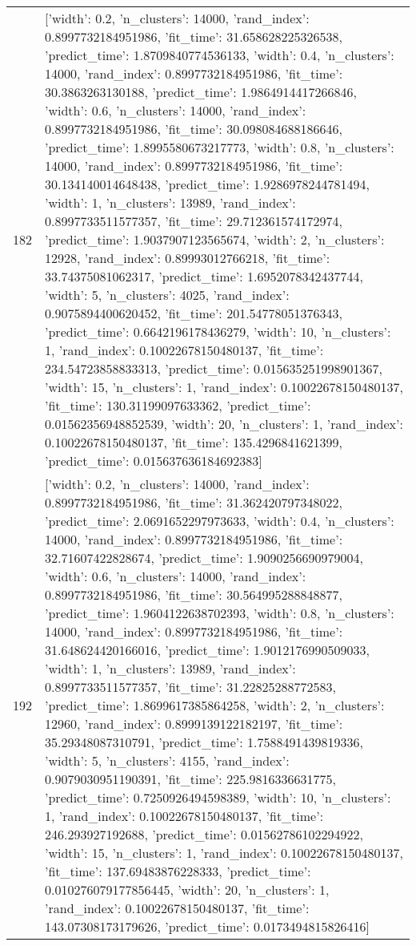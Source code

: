\begin{tabular}{rl}
182 & [{'width': 0.2, 'n_clusters': 14000, 'rand_index': 0.8997732184951986, 'fit_time': 31.658628225326538, 'predict_time': 1.8709840774536133}, {'width': 0.4, 'n_clusters': 14000, 'rand_index': 0.8997732184951986, 'fit_time': 30.3863263130188, 'predict_time': 1.9864914417266846}, {'width': 0.6, 'n_clusters': 14000, 'rand_index': 0.8997732184951986, 'fit_time': 30.098084688186646, 'predict_time': 1.8995580673217773}, {'width': 0.8, 'n_clusters': 14000, 'rand_index': 0.8997732184951986, 'fit_time': 30.134140014648438, 'predict_time': 1.9286978244781494}, {'width': 1, 'n_clusters': 13989, 'rand_index': 0.8997733511577357, 'fit_time': 29.712361574172974, 'predict_time': 1.9037907123565674}, {'width': 2, 'n_clusters': 12928, 'rand_index': 0.89993012766218, 'fit_time': 33.74375081062317, 'predict_time': 1.6952078342437744}, {'width': 5, 'n_clusters': 4025, 'rand_index': 0.9075894400620452, 'fit_time': 201.54778051376343, 'predict_time': 0.6642196178436279}, {'width': 10, 'n_clusters': 1, 'rand_index': 0.10022678150480137, 'fit_time': 234.54723858833313, 'predict_time': 0.015635251998901367}, {'width': 15, 'n_clusters': 1, 'rand_index': 0.10022678150480137, 'fit_time': 130.31199097633362, 'predict_time': 0.01562356948852539}, {'width': 20, 'n_clusters': 1, 'rand_index': 0.10022678150480137, 'fit_time': 135.4296841621399, 'predict_time': 0.015637636184692383}] \\
192 & [{'width': 0.2, 'n_clusters': 14000, 'rand_index': 0.8997732184951986, 'fit_time': 31.362420797348022, 'predict_time': 2.0691652297973633}, {'width': 0.4, 'n_clusters': 14000, 'rand_index': 0.8997732184951986, 'fit_time': 32.71607422828674, 'predict_time': 1.9090256690979004}, {'width': 0.6, 'n_clusters': 14000, 'rand_index': 0.8997732184951986, 'fit_time': 30.564995288848877, 'predict_time': 1.9604122638702393}, {'width': 0.8, 'n_clusters': 14000, 'rand_index': 0.8997732184951986, 'fit_time': 31.648624420166016, 'predict_time': 1.9012176990509033}, {'width': 1, 'n_clusters': 13989, 'rand_index': 0.8997733511577357, 'fit_time': 31.22825288772583, 'predict_time': 1.8699617385864258}, {'width': 2, 'n_clusters': 12960, 'rand_index': 0.8999139122182197, 'fit_time': 35.29348087310791, 'predict_time': 1.7588491439819336}, {'width': 5, 'n_clusters': 4155, 'rand_index': 0.9079030951190391, 'fit_time': 225.9816336631775, 'predict_time': 0.7250926494598389}, {'width': 10, 'n_clusters': 1, 'rand_index': 0.10022678150480137, 'fit_time': 246.293927192688, 'predict_time': 0.01562786102294922}, {'width': 15, 'n_clusters': 1, 'rand_index': 0.10022678150480137, 'fit_time': 137.69483876228333, 'predict_time': 0.010276079177856445}, {'width': 20, 'n_clusters': 1, 'rand_index': 0.10022678150480137, 'fit_time': 143.07308173179626, 'predict_time': 0.0173494815826416}] \\
\bottomrule
\end{tabular}
